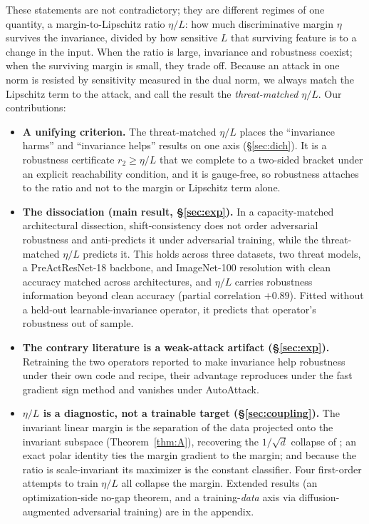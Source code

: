 \documentclass{article}
\theoremstyle{definition}
\newcommand{\dd}{d}
\begin{document}
These statements are not contradictory; they are different regimes of one quantity, a margin-to-Lipschitz ratio $\eta/L$: how much discriminative margin $\eta$ survives the invariance, divided by how sensitive $L$ that surviving feature is to a change in the input. When the ratio is large, invariance and robustness coexist; when the surviving margin is small, they trade off. Because an attack in one norm is resisted by sensitivity measured in the dual norm, we always match the Lipschitz term to the attack, and call the result the \emph{threat-matched} $\eta/L$. Our contributions:
\begin{itemize}[leftmargin=1.2em]
\item \textbf{A unifying criterion.} The threat-matched $\eta/L$ places the ``invariance harms'' and ``invariance helps'' results on one axis (\S\ref{sec:dich}). It is a robustness certificate $r_2\ge\eta/L$ that we complete to a two-sided bracket under an explicit reachability condition, and it is gauge-free, so robustness attaches to the ratio and not to the margin or Lipschitz term alone.
\item \textbf{The dissociation (main result, \S\ref{sec:exp}).} In a capacity-matched architectural dissection, shift-consistency does not order adversarial robustness and anti-predicts it under adversarial training, while the threat-matched $\eta/L$ predicts it. This holds across three datasets, two threat models, a PreActResNet-18 backbone, and ImageNet-100 resolution with clean accuracy matched across architectures, and $\eta/L$ carries robustness information beyond clean accuracy (partial correlation $+0.89$). Fitted without a held-out learnable-invariance operator, it predicts that operator's robustness out of sample.
\item \textbf{The contrary literature is a weak-attack artifact (\S\ref{sec:exp}).} Retraining the two operators reported to make invariance help robustness \citep{saha2024improving,wang2025bridging} under their own code and recipe, their advantage reproduces under the fast gradient sign method and vanishes under AutoAttack.
\item \textbf{$\eta/L$ is a diagnostic, not a trainable target (\S\ref{sec:coupling}).} The invariant linear margin is the separation of the data projected onto the invariant subspace (Theorem~\ref{thm:A}), recovering the $1/\sqrt\dd$ collapse of \citet{ge2021shift}; an exact polar identity ties the margin gradient to the margin; and because the ratio is scale-invariant its maximizer is the constant classifier. Four first-order attempts to train $\eta/L$ all collapse the margin. Extended results (an optimization-side no-gap theorem, and a training-\emph{data} axis via diffusion-augmented adversarial training) are in the appendix.
\end{itemize}
\end{document}
